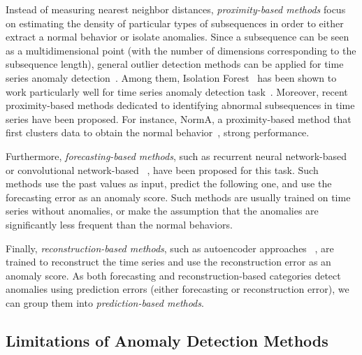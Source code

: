 Instead of measuring nearest neighbor distances, \textit{proximity-based methods} focus on estimating the density of particular types of subsequences in order to either extract a normal behavior or isolate anomalies. Since a subsequence can be seen as a multidimensional point (with the number of dimensions corresponding to the subsequence length), general outlier detection methods can be applied for time series anomaly detection~\cite{liu_isolation_2008,Breunig:2000:LID:342009.335388,ma2020isolation}. Among them, Isolation Forest~\cite{liu_isolation_2008} has been shown to work particularly well for time series anomaly detection task~\cite{Series2GraphPaper}. Moreover, recent proximity-based methods dedicated to identifying abnormal subsequences in time series have been proposed. For instance, NormA, a proximity-based method that first clusters data to obtain the normal behavior~\cite{norm,boniol_unsupervised_2021,DBLP:conf/icde/BoniolLRP20,boniol2021sand,boniol2021sanddemo},  strong performance.

Furthermore, \textit{forecasting-based methods}, such as recurrent neural network-based ~\cite{malhotra_long_2015} or convolutional network-based ~\cite{8581424}, have been proposed for this task. Such methods use the past values as input, predict the following one, and use the forecasting error as an anomaly score. Such methods are usually trained on time series without anomalies, or make the assumption that the anomalies are significantly less frequent than the normal behaviors.

Finally, \textit{reconstruction-based methods}, such as autoencoder approaches ~\cite{10.1145/2689746.2689747}, are trained to reconstruct the time series and use the reconstruction error as an anomaly score. As both forecasting and reconstruction-based categories detect anomalies using prediction errors (either forecasting or reconstruction error), we can group them into \textit{prediction-based methods}. 

\subsection{Limitations of Anomaly Detection Methods} %
\label{sec:limitation}

